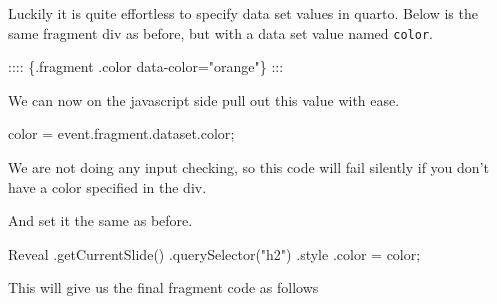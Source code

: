 \documentclass[
  letterpaper,
  DIV=11,
  numbers=noendperiod]{scrreprt}
\newenvironment{Shaded}{\begin{snugshade}}{\end{snugshade}}
\newcommand{\AttributeTok}[1]{\textcolor[rgb]{0.40,0.45,0.13}{#1}}
\newcommand{\BuiltInTok}[1]{\textcolor[rgb]{0.00,0.23,0.31}{#1}}
\newcommand{\FunctionTok}[1]{\textcolor[rgb]{0.28,0.35,0.67}{#1}}
\newcommand{\NormalTok}[1]{\textcolor[rgb]{0.00,0.23,0.31}{#1}}
\newcommand{\OperatorTok}[1]{\textcolor[rgb]{0.37,0.37,0.37}{#1}}
\newcommand{\StringTok}[1]{\textcolor[rgb]{0.13,0.47,0.30}{#1}}
\begin{document}
Luckily it is quite effortless to specify data set values in quarto.
Below is the same fragment div as before, but with a data set value
named \texttt{color}.

\begin{Shaded}
\begin{Highlighting}[]
\NormalTok{:::: \{.fragment .color data{-}color="orange"\}}
\NormalTok{:::}
\end{Highlighting}
\end{Shaded}

We can now on the javascript side pull out this value with ease.

\begin{Shaded}
\begin{Highlighting}[]
\NormalTok{color }\OperatorTok{=} \BuiltInTok{event}\OperatorTok{.}\AttributeTok{fragment}\OperatorTok{.}\AttributeTok{dataset}\OperatorTok{.}\AttributeTok{color}\OperatorTok{;}
\end{Highlighting}
\end{Shaded}

\begin{tcolorbox}[enhanced jigsaw, titlerule=0mm, bottomrule=.15mm, opacityback=0, colbacktitle=quarto-callout-warning-color!10!white, colframe=quarto-callout-warning-color-frame, coltitle=black, breakable, toprule=.15mm, colback=white, bottomtitle=1mm, title=\textcolor{quarto-callout-warning-color}{\faExclamationTriangle}\hspace{0.5em}{Warning}, toptitle=1mm, arc=.35mm, left=2mm, leftrule=.75mm, rightrule=.15mm, opacitybacktitle=0.6]

We are not doing any input checking, so this code will fail silently if
you don't have a color specified in the div.

\end{tcolorbox}

And set it the same as before.

\begin{Shaded}
\begin{Highlighting}[]
\NormalTok{Reveal}
  \OperatorTok{.}\FunctionTok{getCurrentSlide}\NormalTok{()}
  \OperatorTok{.}\FunctionTok{querySelector}\NormalTok{(}\StringTok{"h2"}\NormalTok{)}
  \OperatorTok{.}\AttributeTok{style}
  \OperatorTok{.}\AttributeTok{color} \OperatorTok{=}\NormalTok{ color}\OperatorTok{;}
\end{Highlighting}
\end{Shaded}

This will give us the final fragment code as follows
\end{document}
